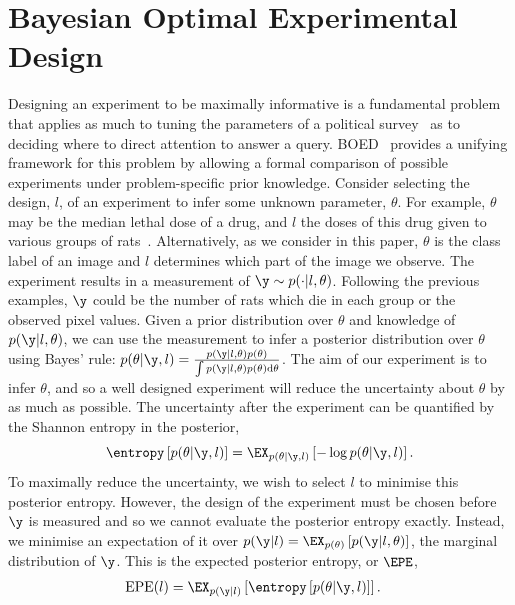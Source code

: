 \section{Bayesian Optimal Experimental Design} \label{sec:nogs-boed} Designing an
experiment to be maximally informative is a fundamental problem that applies as
much to tuning the parameters of a political survey~\cite{warwick1975sample} as
to deciding where to direct attention to answer a query.
BOED~\cite{chaloner1995bayesian} provides a unifying framework for this problem
by allowing a formal comparison of possible experiments under problem-specific
prior knowledge.
%
Consider selecting the design, $l$, of an experiment to infer some unknown
parameter, $\theta$. For example, $\theta$ may be the median lethal dose of a
drug, and $l$ the doses of this drug given to various groups of
rats~\cite{chaloner1995bayesian}. Alternatively, as we consider in this paper,
$\theta$ is the class label of an image and $l$ determines which part of the
image we observe.
%
The experiment results in a measurement of $\y \sim p(\cdot|l, \theta)$. Following
the previous examples, $\y$ could be the number of rats which die in each group
or the observed pixel values. Given a prior distribution over $\theta$ and
knowledge of $p(\y|l, \theta)$, we can use the measurement to infer a posterior
distribution over $\theta$ using Bayes' rule: $p(\theta|\y,l) = \frac{p(\y|l,
  \theta)p(\theta)}{\int p(\y|l, \theta)p(\theta) \mathrm{d}\theta}$.
The aim of our experiment is to infer $\theta$, and so a well designed
experiment will reduce the uncertainty about $\theta$ by as much as possible.
The uncertainty after the experiment can be quantified by the Shannon entropy in
the posterior,
\begin{equation}
  \label{eq:pe}
  \entropy \left[ p(\theta | \y, l) \right] = \EX_{p(\theta | \y, l)} \left[ - \log p(\theta | \y, l) \right].
\end{equation}
To maximally reduce the uncertainty, we wish to select $l$ to minimise this
posterior entropy. However, the design of the experiment must be chosen before
$\y$ is measured and so we cannot evaluate the posterior entropy exactly.
Instead, we minimise an expectation of it over $p(\y|l)=\EX_{p(\theta)}\left[
  p(\y|l, \theta) \right]$, the marginal distribution of $\y$. This is the
expected posterior entropy, or $\EPE$,
\begin{align}
  \label{eq:epe}
  \text{EPE} (l) &= \EX_{p(\y|l)} \left[ \entropy \left[ p(\theta | \y, l) \right]  \right].
\end{align}
